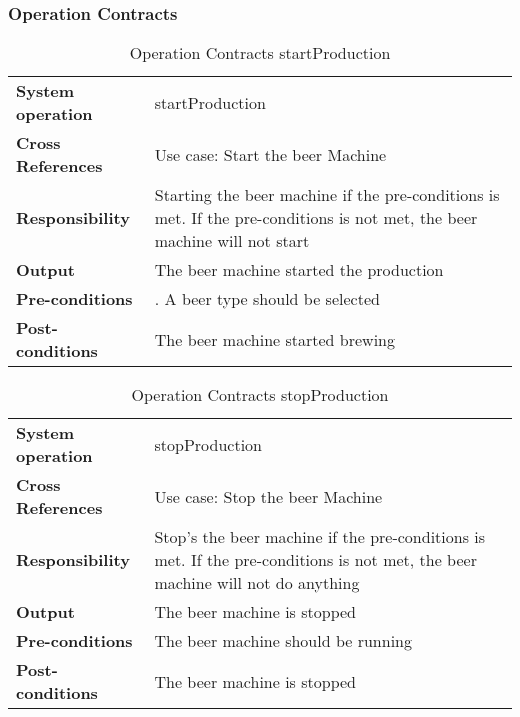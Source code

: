 \subsubsection{Operation Contracts}
\begin{table}[H]
    \begin{tabularx}{\textwidth}{|>{\RaggedRight}p{3.7cm}|>{\RaggedRight}X|}
        \hline
        \multicolumn{2}{|c|}{\textbf{startProduction}}\\
        \hline
        \textbf{System operation} & startProduction\\
        \hline
        \textbf{Cross References} & Use case: Start the beer Machine\\
        \hline
        \textbf{Responsibility} & Starting the beer machine if the pre-conditions 
        is met.
            If the pre-conditions is not met, the beer machine will not start \\
        \hline
        \textbf{Output} & The beer machine started the production\\
        \hline
        \textbf{Pre-conditions} & 
                1. A beer type should be selected
            \\
        \hline
        \textbf{Post-conditions} & The beer machine started brewing\\
        \hline
    \end{tabularx}
    \caption{Operation Contracts startProduction} 
    \label{table:Operation_Contracts_startProduction}
\end{table}

\begin{table}[H]
    \begin{tabularx}{\textwidth}{|>{\RaggedRight}p{3.7cm}|>{\RaggedRight}X|}
        \hline
        \multicolumn{2}{|c|}{\textbf{stopProduction}}\\
        \hline
        \textbf{System operation} & stopProduction\\
        \hline
        \textbf{Cross References} & Use case: Stop the beer Machine\\
        \hline
        \textbf{Responsibility} & Stop's the beer machine if the pre-conditions is met.
        If the pre-conditions is not met, the beer machine will not do anything\\
        \hline
        \textbf{Output} & The beer machine is stopped\\
        \hline
        \textbf{Pre-conditions} & The beer machine should be running\\
        \hline
        \textbf{Post-conditions} & The beer machine is stopped\\
        \hline
    \end{tabularx}
    \caption{Operation Contracts stopProduction} 
    \label{table:Operation_Contracts_stopProduction}
\end{table}

